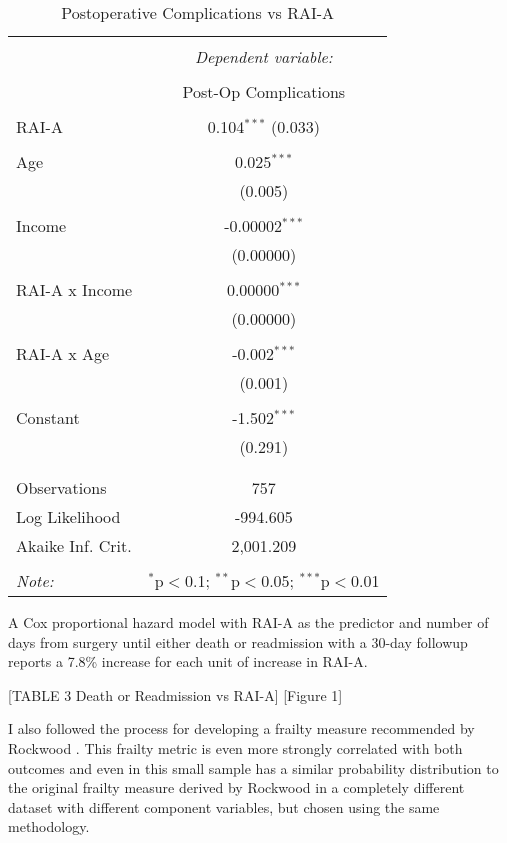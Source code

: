 \begin{table}[!htbp] 
  \caption{Postoperative Complications vs RAI-A}
\begin{tabular}{@{\extracolsep{5pt}}lc} 
\\[-1.8ex]\hline 
\hline \\[-1.8ex] 
 & \multicolumn{1}{c}{\textit{Dependent variable:}} \\ 
\cline{2-2} 
\\[-1.8ex] & Post-Op Complications \\ 
\hline \\[-1.8ex] 
 RAI-A & 0.104$^{***}$ (0.033) \\ 
  & \\ 
 Age & 0.025$^{***}$ \\ 
  & (0.005) \\ 
  & \\ 
 Income & -0.00002$^{***}$ \\ 
  & (0.00000) \\ 
  & \\ 
 RAI-A x Income & 0.00000$^{***}$ \\ 
  & (0.00000) \\ 
  & \\ 
 RAI-A x Age & -0.002$^{***}$ \\ 
  & (0.001) \\ 
  & \\ 
 Constant & -1.502$^{***}$ \\ 
  & (0.291) \\ 
  & \\ 
\hline \\[-1.8ex] 
Observations & 757 \\ 
Log Likelihood & -994.605 \\ 
Akaike Inf. Crit. & 2,001.209 \\ 
\hline 
\hline \\[-1.8ex] 
\textit{Note:}  & \multicolumn{1}{r}{$^{*}$p$<$0.1; $^{**}$p$<$0.05; $^{***}$p$<$0.01} \\ 
\end{tabular} 
\end{table} 

A Cox proportional hazard model with RAI-A as the predictor and number of days from surgery until either death or readmission with a 30-day followup reports a 7.8\% increase for each unit of increase in RAI-A.

[TABLE 3 Death or Readmission vs RAI-A] [Figure 1]

I also followed the process for developing a frailty measure recommended by Rockwood \cite{Rockwood_2005}. This frailty metric is even more strongly correlated with both outcomes and even in this small sample has a similar probability distribution to the original frailty measure derived by Rockwood \cite{Mitnitski_2001} in a completely different dataset with different component variables, but chosen using the same methodology.

